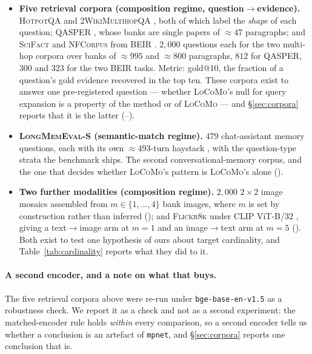 \begin{itemize}
  sessions and $501$ dialogues \citep{xu2022msc}, run through the \emph{unmodified}
  \textsc{LoCoMo} association driver so that the only thing that changes is the corpus. This
  is the second public corpus for \S\ref{sec:composition} and the largest bank in the paper
  ().
\item \textbf{Five retrieval corpora (composition regime, question$\to$evidence).}
  \textsc{HotpotQA} \citep{yang2018hotpotqa} and \textsc{2WikiMultihopQA}
  \citep{ho2020twowiki}, both of which label the \emph{shape} of each question;
  \textsc{QASPER} \citep{dasigi2021qasper}, whose banks are single papers of
  ${\approx}47$ paragraphs; and \textsc{SciFact} and \textsc{NFCorpus} from \textsc{BEIR}
  \citep{thakur2021beir}. $2{,}000$ questions each for the two multi-hop corpora over banks
  of ${\approx}995$ and ${\approx}800$ paragraphs, $812$ for \textsc{QASPER}, $300$ and
  $323$ for the two \textsc{BEIR} tasks. Metric: gold@10, the fraction of a question's gold
  evidence recovered in the top ten. These corpora exist to answer one pre-registered
  question --- whether \textsc{LoCoMo}'s null for query expansion is a property of the
  method or of \textsc{LoCoMo} --- and \S\ref{sec:corpora} reports that it is the latter
  (--).
\item \textbf{\textsc{LongMemEval-S} (semantic-match regime).} $479$ chat-assistant memory
  questions, each with its own ${\approx}493$-turn haystack \citep{wu2025longmemeval}, with
  the question-type strata the benchmark ships. The second conversational-memory corpus, and
  the one that decides whether \textsc{LoCoMo}'s pattern is \textsc{LoCoMo}'s alone
  ().
\item \textbf{Two further modalities (composition regime).} $2{,}000$ $2{\times}2$ image
  mosaics assembled from $m\in\{1,\dots,4\}$ bank images, where $m$ is set by construction
  rather than inferred (); and \textsc{Flickr8k} under CLIP ViT-B/32
  \citep{radford2021clip}, giving a text$\to$image arm at $m{=}1$ and an image$\to$text arm
  at $m{=}5$ (). Both exist to test one hypothesis of ours about target
  cardinality, and Table~\ref{tab:cardinality} reports what they did to it.
\end{itemize}

\paragraph{A second encoder, and a note on what that buys.} The five retrieval corpora above
were re-run under \texttt{bge-base-en-v1.5} \citep{xiao2024bge} as a robustness check. We
report it as a check and not as a second experiment: the matched-encoder rule holds
\emph{within} every comparison, so a second encoder tells us whether a conclusion is an
artefact of \texttt{mpnet}, and \S\ref{sec:corpora} reports one conclusion that is.

